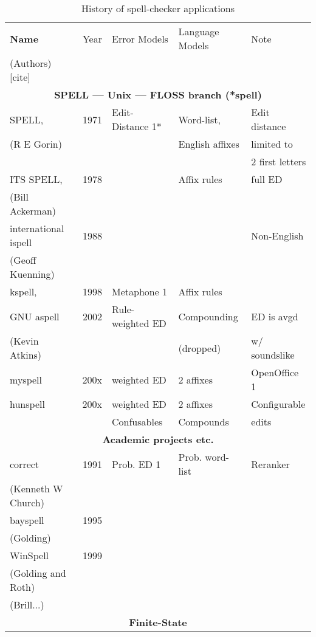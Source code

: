 \documentclass[officiallayout,draft]{unihelcompling}
\begin{document}
\begin{table}
    \begin{tabular}{|l|r|l|l|l|}
        \hline
        \bf Name & Year & Error Models & Language Models & Note \\
(Authors) [cite] & & & & \\
        \hline
        \multicolumn{5}{|c|}{\bf SPELL --- Unix --- FLOSS branch (*spell) }\\
        \hline
             SPELL, & 1971 & Edit-Distance 1* & Word-list, & Edit distance \\
(R E Gorin)~\cite{gorin1971spell} &  & & English affixes & limited to \\
                                  &  & &              & 2 first letters \\
        ITS SPELL, & 1978 &  & Affix rules & full ED \\
     (Bill Ackerman) & & & & \\
        international ispell & 1988 & & & Non-English \\
              (Geoff Kuenning) & & & & \\
        \hline
        kspell, & 1998 & Metaphone 1 & Affix rules & \\
        GNU aspell & 2002 & Rule-weighted ED & Compounding & ED is avgd \\
    (Kevin Atkins) & & & (dropped) & w/ soundslike \\
        \hline
        myspell & 200x & weighted ED & 2 affixes & OpenOffice 1 \\
        \hline
        hunspell & 200x & weighted ED & 2 affixes & Configurable \\
                 &      & Confusables & Compounds & edits \\
        \hline
        \multicolumn{5}{|c|}{\bf Academic projects etc.} \\
        \hline
        correct & 1991 & Prob. ED 1 & Prob. word-list & Reranker \\
        (Kenneth W Church)\cite{church1991probability} & & & & \\
        \hline
        bayspell  & 1995 \\
        (Golding)\cite{golding1995} \\
        \hline
        WinSpell & 1999 \\
        (Golding and Roth)\cite{golding1999} & \\
        \hline
        (Brill...) \\
        \hline
        \multicolumn{5}{|c|}{\bf Finite-State} \\
        \hline
    \end{tabular}
    \caption{History of spell-checker applications \label{table:history-apps}}
\end{table}
\end{document}
